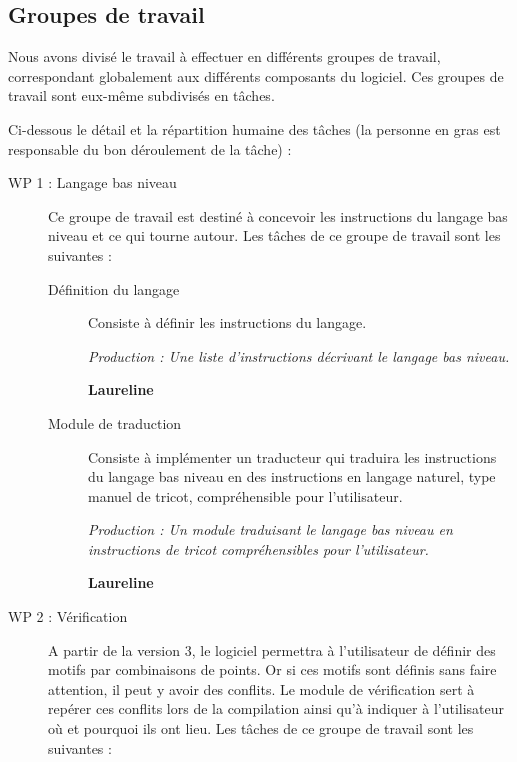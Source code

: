 \documentclass{article}
\begin{document}

\subsection{Groupes de travail\label{workpackages}}

Nous avons divisé le travail à effectuer en différents groupes de travail, correspondant globalement aux différents composants du 
logiciel. Ces groupes de travail sont eux-même subdivisés en tâches.

Ci-dessous le détail et la répartition humaine des tâches (la personne en gras est responsable du bon déroulement de la tâche) :

\begin{description}
\item[WP 1 : Langage bas niveau] Ce groupe de travail est destiné à concevoir les instructions du langage bas niveau et ce qui tourne 
autour. Les tâches de ce groupe de travail sont les suivantes :

    \begin{description}
    \item[Définition du langage] Consiste à définir les instructions du langage.

      \textit{Production : Une liste d'instructions décrivant le langage bas niveau.}

      \textbf{Laureline}

    \item[Module de traduction] Consiste à implémenter un traducteur qui traduira les instructions du langage bas niveau en des 
instructions en langage naturel, type manuel de tricot, compréhensible pour l'utilisateur.

      \textit{Production : Un module traduisant le langage bas niveau en instructions de tricot compréhensibles pour l'utilisateur.}

      \textbf{Laureline}
    \end{description}

\medskip

\item[WP 2 : Vérification] A partir de la version 3, le logiciel permettra à l'utilisateur de définir des motifs par combinaisons de 
points. Or si ces motifs sont définis sans faire attention, il peut y avoir des conflits. Le module de vérification sert à repérer ces 
conflits lors de la compilation ainsi qu'à indiquer à l'utilisateur où et pourquoi ils ont lieu. Les tâches de ce groupe de travail sont 
les suivantes :


\end{description}
\end{document}
